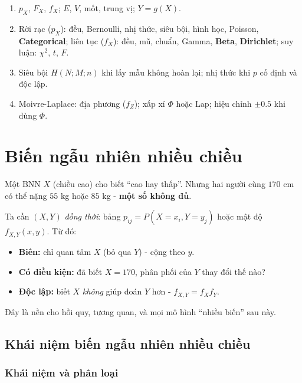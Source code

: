 \documentclass[12pt,a4paper]{article}
\begin{document}
\begin{tongket}[title={Tổng kết: Biến ngẫu nhiên và phân phối}]
\begin{enumerate}
  \item $p_X$, $F_X$, $f_X$; $E$, $V$, mốt, trung vị; $Y = g(X)$.
  \item Rời rạc ($p_X$): đều, Bernoulli, nhị thức, siêu bội, hình học, Poisson, \textbf{Categorical}; liên tục ($f_X$): đều, mũ, chuẩn, Gamma, \textbf{Beta}, \textbf{Dirichlet}; suy luận: $\chi^2$, $t$, $F$.
  \item Siêu bội $H(N;M;n)$ khi lấy mẫu không hoàn lại; nhị thức khi $p$ cố định và độc lập.
  \item Moivre-Laplace: địa phương ($f_Z$); xấp xỉ $\Phi$ hoặc $\mathrm{Lap}$; hiệu chỉnh $\pm 0.5$ khi dùng $\Phi$.
\end{enumerate}
\end{tongket}

\section{Biến ngẫu nhiên nhiều chiều}

\begin{dongco}[title={Động cơ học - Chiều cao và cân nặng}]
Một BNN $X$ (chiều cao) cho biết ``cao hay thấp''. Nhưng hai người cùng $170$ cm có thể nặng $55$ kg hoặc $85$ kg - \textbf{một số không đủ}.

Ta cần $(X,Y)$ \emph{đồng thời}: bảng $p_{ij} = P(X=x_i, Y=y_j)$ hoặc mật độ $f_{X,Y}(x,y)$. Từ đó:
\begin{itemize}
  \item \textbf{Biên:} chỉ quan tâm $X$ (bỏ qua $Y$) - cộng theo $y$.
  \item \textbf{Có điều kiện:} đã biết $X = 170$, phân phối của $Y$ thay đổi thế nào?
  \item \textbf{Độc lập:} biết $X$ \emph{không} giúp đoán $Y$ hơn - $f_{X,Y} = f_X f_Y$.
\end{itemize}
Đây là nền cho hồi quy, tương quan, và mọi mô hình ``nhiều biến'' sau này.
\end{dongco}

\subsection{Khái niệm biến ngẫu nhiên nhiều chiều}

\subsubsection{Khái niệm và phân loại}
\end{document}
